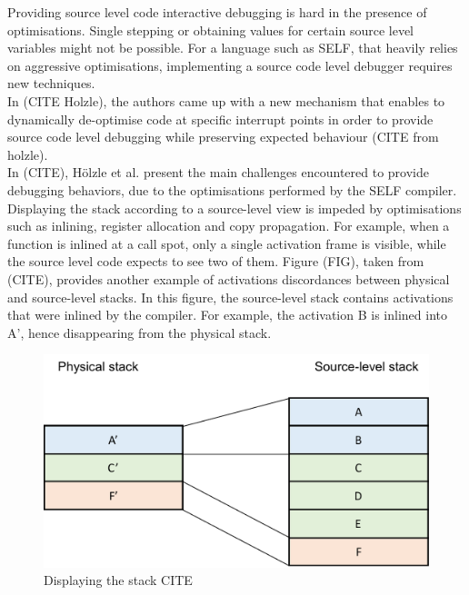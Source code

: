 Providing source level code interactive debugging is hard in the presence of optimisations.
Single stepping or obtaining values for certain source level variables might not be possible.
For a language such as SELF, that heavily relies on aggressive optimisations, implementing a source code level debugger requires new techniques.\\

In (CITE Holzle), the authors came up with a new mechanism that enables to dynamically de-optimise code at specific interrupt points in order to provide source code level debugging while preserving expected behaviour (CITE from holzle).\\

In (CITE), Hölzle et al. present the main challenges encountered to provide debugging behaviors, due to the optimisations performed by the SELF compiler. 
Displaying the stack according to a source-level view is impeded by optimisations such as inlining, register allocation and copy propagation.
For example, when a function is inlined at a call spot, only a single activation frame is visible, while the source level code expects to see two of them.
Figure (FIG), taken from (CITE), provides another example of activations discordances between physical and source-level stacks.
In this figure, the source-level stack contains activations that were inlined by the compiler. For example, the activation B is inlined into A', hence disappearing from the physical stack.\\
\begin{figure}[h]
\centering
\includegraphics[scale=0.5]{Figures/Figure1}
\decoRule
\caption[physical vs. source-level stacks]{Displaying the stack CITE}
\end{figure}


